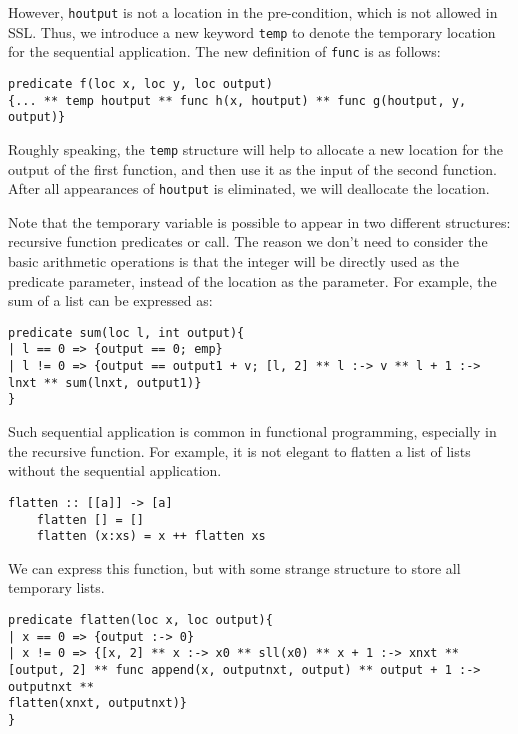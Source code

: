 However, \lstinline{houtput} is not a location in the pre-condition, which is not allowed in SSL. Thus, we introduce a new keyword \lstinline{temp} to denote the temporary location for the sequential application. The new definition of \lstinline{func} is as follows:

\begin{lstlisting}[language=SynLang]
predicate f(loc x, loc y, loc output)
{... ** temp houtput ** func h(x, houtput) ** func g(houtput, y, output)}
\end{lstlisting}

Roughly speaking, the \lstinline{temp} structure will help to allocate a new location for the output of the first function, and then use it as the input of the second function. After all appearances of \lstinline{houtput} is eliminated, we will deallocate the location.

Note that the temporary variable is possible to appear in two different structures: recursive function predicates or \func call. The reason we don't need to consider the basic arithmetic operations is that the integer will be directly used as the predicate parameter, instead of the location as the parameter. For example, the sum of a list can be expressed as:

\begin{lstlisting}[language=SynLang]
predicate sum(loc l, int output){
| l == 0 => {output == 0; emp}
| l != 0 => {output == output1 + v; [l, 2] ** l :-> v ** l + 1 :-> lnxt ** sum(lnxt, output1)}
}
\end{lstlisting}

Such sequential application is common in functional programming, especially in the recursive function. For example, it is not elegant to flatten a list of lists without the sequential application. 

\begin{lstlisting}[language=Pika]
    flatten :: [[a]] -> [a]
    flatten [] = []
    flatten (x:xs) = x ++ flatten xs
\end{lstlisting}

We can express this function, but with some strange structure to store all temporary lists.

\begin{lstlisting}[language=SynLang]
predicate flatten(loc x, loc output){
| x == 0 => {output :-> 0}
| x != 0 => {[x, 2] ** x :-> x0 ** sll(x0) ** x + 1 :-> xnxt **
[output, 2] ** func append(x, outputnxt, output) ** output + 1 :-> outputnxt **
flatten(xnxt, outputnxt)}
}
\end{lstlisting}

